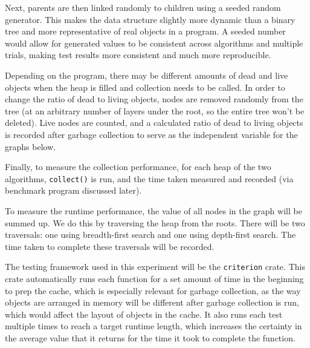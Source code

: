 \documentclass[index]{subfiles}
\begin{document}
Next, parents are then linked randomly to children using a seeded random generator. This makes the data structure slightly more dynamic than a binary tree and more representative of real objects in a program. A seeded number would allow for generated values to be consistent across algorithms and multiple trials, making test results more consistent and much more reproducible.

Depending on the program, there may be different amounts of dead and live objects when the heap is filled and collection needs to be called. In order to change the ratio of dead to living objects, nodes are removed randomly from the tree (at an arbitrary number of layers under the root, so the entire tree won't be deleted). Live nodes are counted, and a calculated ratio of dead to living objects is recorded after garbage collection to serve as the independent variable for the graphs below.

Finally, to measure the collection performance, for each heap of the two algorithms, \verb+collect()+ is run, and the time taken measured and recorded (via benchmark program discussed later).

To measure the runtime performance, the value of all nodes in the graph will be summed up. We do this by traversing the heap from the roots. There will be two traversals: one using breadth-first search and one using depth-first search. The time taken to complete these traversals will be recorded.

The testing framework used in this experiment will be the \verb+criterion+ crate. This crate automatically runs each function for a set amount of time in the beginning to prep the cache\cite{brookheislerAnalysisProcessCriterion}, which is especially relevant for garbage collection, as the way objects are arranged in memory will be different after garbage collection is run, which would affect the layout of objects in the cache. It also runs each test multiple times to reach a target runtime length, which increases the certainty in the average value that it returns for the time it took to complete the function\cite{brookheislerAnalysisProcessCriterion}.
\end{document}

